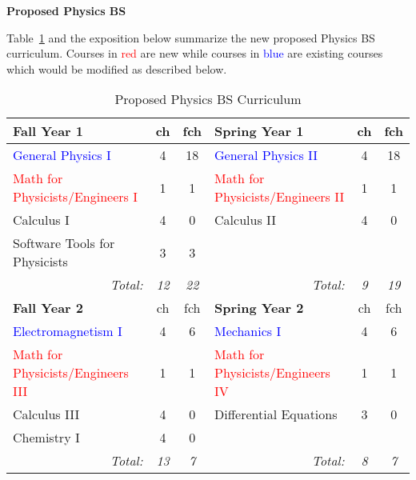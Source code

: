 \documentclass[12pt,preprint]{aastex}
\newcommand{\red}[1]{\textcolor{red}{#1}}
\newcommand{\blue}[1]{\textcolor{blue}{#1}}
\begin{document}
\newpage

\vspace{2mm}
{\large \sc \textbf{Proposed Physics BS}}

Table~\ref{table:bs} and the exposition below summarize the new proposed Physics
BS curriculum.  Courses in \red{red} are new while courses in \blue{blue} are
existing courses which would be modified as described below.

\begin{longtable}{lcclcc}
\caption{Proposed Physics BS Curriculum}\label{table:bs} \\
\hline
{\bf Fall Year 1} & {\sc ch} & {\sc fch} & {\bf Spring Year 1} & {\sc ch} & {\sc fch}  \\ 
\hline
\hline
\blue{General Physics I}                 & 4 & 18 & \blue{General Physics II} & 4 & 18 \\
\red{Math for Physicists/Engineers I} & 1 &  1 & \red{Math for Physicists/Engineers II} & 1 & 1 \\ 
Calculus I                               & 4 &  0 & Calculus II & 4 & 0 \\
Software Tools for Physicists            & 3 &  3 &             &   &   \\
\multicolumn{1}{r}{\emph{Total:}} & \emph{12} & \emph{22} &
\multicolumn{1}{r}{\emph{Total:}} & \emph{9}  & \emph{19} \\

\hline
{\bf Fall Year 2} & {\sc ch} & {\sc fch} & {\bf Spring Year 2} & {\sc ch} & {\sc fch} \\ 
\hline
\hline
\blue{Electromagnetism I}                  & 4 & 6 & \blue{Mechanics I}     & 4 & 6 \\
\red{Math for Physicists/Engineers III} & 1 & 1 & \red{Math for Physicists/Engineers IV} & 1 & 1 \\ 
Calculus III                               & 4 & 0 & Differential Equations & 3 & 0 \\
Chemistry I                                & 4 & 0 &                        &   &  \\
\multicolumn{1}{r}{\emph{Total:}} & \emph{13} & \emph{7} &
\multicolumn{1}{r}{\emph{Total:}} & \emph{8}  & \emph{7} \\


\end{longtable}
\end{document}
